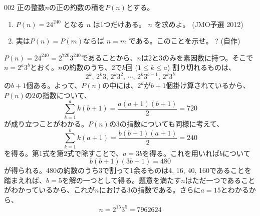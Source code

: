 \begin{prob}{002}{}{}
 正の整数$n$の正の約数の積を$P(n)$とする。
 \begin{enumerate}
  \item $P(n)=24^{240}$ となる $n$ は1つだけある。 $n$ を求めよ。  (JMO予選 2012)
  \item 実は$P(n)=P(m)$ならば $n=m$ である。このことを示せ。 \hosi ? (自作)
 \end{enumerate}
\end{prob}

$P(n)=24^{240}=2^{720} 3^{240}$であることから、$n$は2と3のみを素因数に持つ。そこで$n=2^a 3^b$とおく。$n$の約数のうち、2で$k$回 ($1\le k\le a$) 割り切れるものは、
\[ 2^k,\, 2^k 3,\, 2^k 3^2,\, \cdots,\, 2^k 3^{b-1},\, 2^k 3^b \]
の$b+1$個ある。よって、$P(n)$の中には、$2^k$が$b+1$個掛け算されているから、$P(n)$の2の指数について、
\[ \sum_{k=1}^a k(b+1) = \frac{a(a+1)(b+1)}{2} = 720 \]
が成り立つことがわかる。$P(n)$の3の指数についても同様に考えて、
\[ \sum_{k=1}^b k(a+1) = \frac{b(b+1)(a+1)}{2} = 240 \]
を得る。第1式を第2式で除すことで、$a=3b$を得る。これを用いれば$b$について
\[ b(b+1)(3b+1)=480 \]
が得られる。480の約数のうち3で割って1余るものは4, 16, 40, 160であることを踏まえれば、$b=5$を解の一つとして得る。題意を満たす$n$はただ一つであることがわかっているから、これが$n$における3の指数である。さらに$a=15$とわかるから、
\[ n=2^{15} 3^5=7962624 \]

